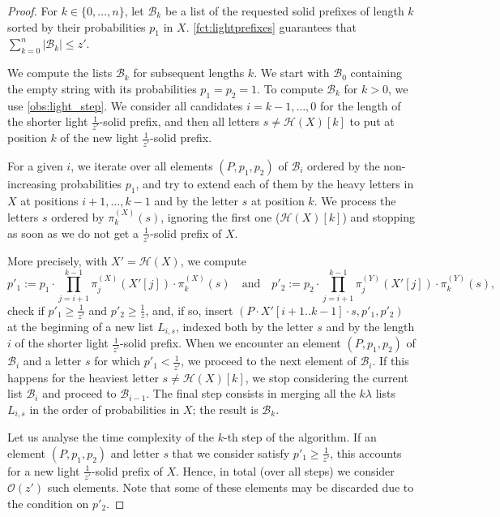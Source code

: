 \documentclass{article}
\theoremstyle{plain}
\theoremstyle{definition}
\newcommand{\Oh}{\mathcal{O}}
\renewcommand{\H}{\mathcal{H}}
\newcommand{\B}{\mathcal{B}}
\begin{document}
      \begin{proof}
        For $k \in \{0,\ldots,n\}$, 
        let $\B_k$ be a list of the requested solid prefixes of length $k$ sorted by their probabilities $p_1$ in $X$.
        \cref{fct:lightprefixes} guarantees that $\sum_{k=0}^n |\B_k| \le z'$.
        
        We compute the lists $\B_k$ for subsequent lengths $k$.
        We start with $\B_0$ containing the empty string with its probabilities $p_1=p_2=1$.
        To compute $\B_k$ for $k>0$, we use \cref{obs:light_step}.
        We consider all candidates $i=k-1,\ldots,0$ for the length of the shorter light $\frac{1}{z'}$-solid prefix,
        and then all letters $s\ne \H(X)[k]$ to put at position $k$ of the new  light $\frac{1}{z'}$-solid prefix.
        
        For a given $i$, we iterate over all elements $(P,p_1,p_2)$ of $\B_i$ ordered by the non-increasing probabilities $p_1$, 
        and try to extend each of them by the heavy letters in $X$ at positions $i+1,\ldots,k-1$ and by the letter $s$ at position $k$.
        We process the letters $s$ ordered by $\pi_k^{(X)}(s)$, ignoring the first one ($\H(X)[k]$) and stopping as soon as we do not get a $\frac{1}{z'}$-solid prefix of $X$. 
                
        More precisely, with $X'=\H(X)$, we compute
        $$p'_1:=p_1 \cdot \prod_{j=i+1}^{k-1} \pi^{(X)}_j(X'[j]) \cdot \pi^{(X)}_k(s)\quad\mbox{and}\quad
          p'_2:=p_2 \cdot \prod_{j=i+1}^{k-1} \pi^{(Y)}_j(X'[j]) \cdot \pi^{(Y)}_k(s),$$
        check if $p'_1 \ge \frac{1}{z'}$ and $p'_2 \ge \frac1z$, and, if so, insert
        $(P \cdot X'[i+1..k-1] \cdot s,p'_1,p'_2)$ at the beginning of a new list $L_{i,s}$, indexed both by the letter $s$
        and by the length $i$ of the shorter light $\frac{1}{z'}$-solid prefix.      
        When we encounter an element $(P,p_1,p_2)$ of $\B_i$ and a letter $s$ for which $p'_1 < \frac{1}{z'}$, we proceed to the next element of $\B_i$.
        If this happens for the heaviest letter $s\ne \H(X)[k]$, we stop considering the current list $\B_i$ and proceed to $\B_{i-1}$.
        The final step consists in merging all the $k\lambda$ lists $L_{i,s}$ in the order of probabilities in $X$;
        the result is $\B_k$.

        Let us analyse the time complexity of the $k$-th step of the algorithm.
        If an element $(P,p_1,p_2)$ and letter $s$ that we consider satisfy $p'_1 \ge \frac{1}{z'}$, this accounts for a new light $\frac{1}{z'}$-solid prefix of $X$.
        Hence, in total (over all steps) we consider $\Oh(z')$ such elements.
        Note that some of these elements may be discarded due to the condition on $p'_2$.
        

\end{proof}
\end{document}

